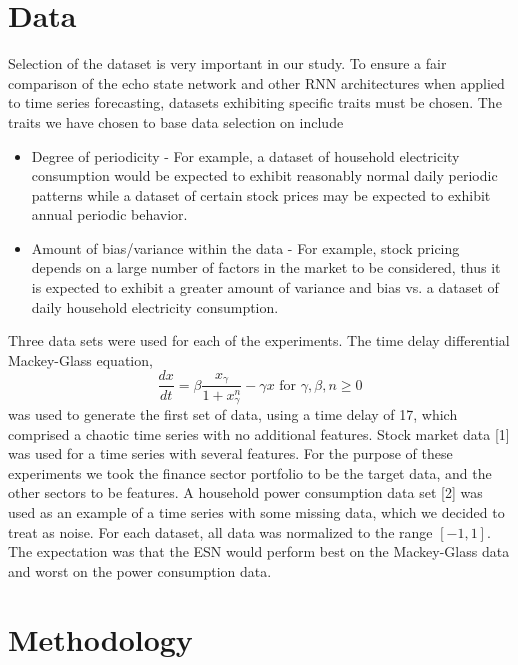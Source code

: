 \documentclass{acm_proc_article-sp}
\begin{document}
\section{Data}
Selection of the dataset is very important in our study. To ensure a fair comparison of the echo state network and other RNN architectures when applied to time series forecasting, datasets exhibiting specific traits must be chosen. The traits we have chosen to base data selection on include
\begin{itemize}
\item Degree of periodicity - For example, a dataset of household electricity consumption would be expected to exhibit reasonably normal daily periodic patterns while a dataset of certain stock prices may be expected to exhibit annual periodic behavior.
\item Amount of bias/variance within the data - For example, stock pricing depends on a large number of factors in the market to be considered, thus it is expected to exhibit a greater amount of variance and bias vs. a dataset of daily household electricity consumption.
\end{itemize}
Three data sets were used for each of the experiments. The time delay differential Mackey-Glass equation,
\begin{equation*}
\frac{dx}{dt} = \beta \frac{x_\gamma}{1+x_{\gamma}^n} - \gamma x \text{  for  } \gamma, \beta, n \ge 0
\end{equation*}
was used to generate the first set of data, using a time delay of 17, which comprised a chaotic time series with no additional features. Stock market data [1] was used for a time series with several features. For the purpose of these experiments we took the finance sector portfolio to be the target data, and the other sectors to be features. A household power consumption data set [2] was used as an example of a time series with some missing data, which we decided to treat as noise. For each dataset, all data was normalized to the range $[-1,1]$. The expectation was that the ESN would perform best on the Mackey-Glass data and worst on the power consumption data.

\section{Methodology}
\end{document}
